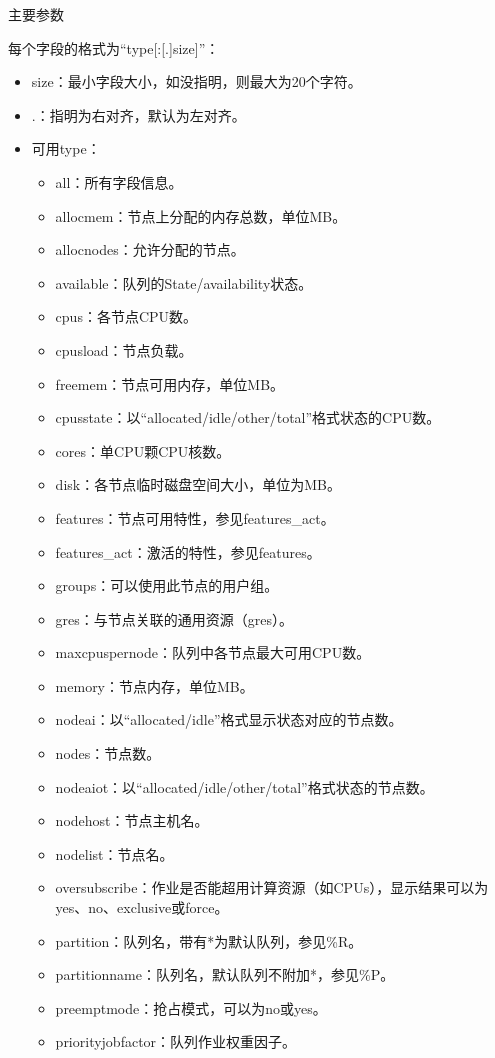 \begin{frame}{主要参数}
\begin{itemize}
每个字段的格式为``type[:[.]size]''：
\begin{itemize}
	\item size：最小字段大小，如没指明，则最大为20个字符。
    \item .：指明为右对齐，默认为左对齐。
	\item 可用type：
\begin{itemize}
   	\item all：所有字段信息。
   	\item allocmem：节点上分配的内存总数，单位MB。
   	\item allocnodes：允许分配的节点。
   	\item available：队列的State/availability状态。
   	\item cpus：各节点CPU数。
   	\item cpusload：节点负载。
   	\item freemem：节点可用内存，单位MB。
   	\item cpusstate：以``allocated/idle/other/total''格式状态的CPU数。
   	\item cores：单CPU颗CPU核数。
   	\item disk：各节点临时磁盘空间大小，单位为MB。
   	\item features：节点可用特性，参见features\_act。
   	\item features\_act：激活的特性，参见features。
   	\item groups：可以使用此节点的用户组。
   	\item gres：与节点关联的通用资源（gres）。
   	\item maxcpuspernode：队列中各节点最大可用CPU数。
   	\item memory：节点内存，单位MB。
   	\item nodeai：以``allocated/idle''格式显示状态对应的节点数。
   	\item nodes：节点数。
   	\item nodeaiot：以``allocated/idle/other/total''格式状态的节点数。
   	\item nodehost：节点主机名。
   	\item nodelist：节点名。
   	\item oversubscribe：作业是否能超用计算资源（如CPUs），显示结果可以为yes、no、exclusive或force。
   	\item partition：队列名，带有*为默认队列，参见\%R。
   	\item partitionname：队列名，默认队列不附加*，参见\%P。
   	\item preemptmode：抢占模式，可以为no或yes。
   	\item priorityjobfactor：队列作业权重因子。

\end{itemize}
\end{itemize}
\end{itemize}
\end{frame}
